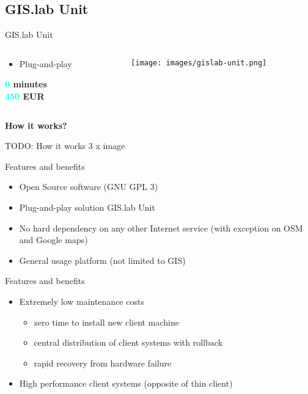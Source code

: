 \documentclass[12pt]{beamer}
\begin{document}
\subsection{GIS.lab Unit}
\begin{frame}{GIS.lab Unit}
	\begin{minipage}[\textheight]{\textwidth}
	\begin{columns}[T]
		\begin{column}{0.5\textwidth}
			\vspace{0.3\textheight}
			\begin{itemize}
				\item Plug-and-play
			\end{itemize}
			\begin{flushleft}
				\textbf{\textcolor{Cyan}{0} minutes} \\
				\textbf{\textcolor{Cyan}{450} EUR} \\
			\end{flushleft}
		\end{column}
		\begin{column}{0.5\textwidth}
			\texttt{[image: images/gislab-unit.png]}
		\end{column}
	\end{columns}
	\end{minipage}
\end{frame}


\begin{frame}
	\LARGE \textbf{How it works?}
\end{frame}


\begin{frame}
	TODO: How it works 3 x image
\end{frame}


\begin{frame}{Features and benefits}
	\begin{itemize}
		\item Open Source software (GNU GPL 3)
		\item Plug-and-play solution GIS.lab Unit
		\item No hard dependency on any other Internet service (with exception on OSM and Google maps)
		\item General usage platform (not limited to GIS)
	\end{itemize}
\end{frame}


\begin{frame}{Features and benefits}
	\begin{itemize}
		\item Extremely low maintenance costs
		\begin{itemize}
			\item zero time to install new client machine
			\item central distribution of client systems with rollback
			\item rapid recovery from hardware failure
		\end{itemize}
		\item High performance client systems (opposite of thin client)
	\end{itemize}
\end{frame}
\end{document}
